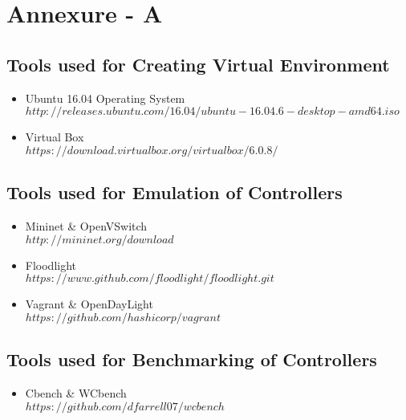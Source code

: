 \chapter*{Annexure - A}

\section*{Tools used for Creating Virtual Environment}

\begin{itemize}

    \item Ubuntu 16.04 Operating System \\
    $http://releases.ubuntu.com/16.04/ubuntu-16.04.6-desktop-amd64.iso$
    
    \item Virtual Box \\
    $https://download.virtualbox.org/virtualbox/6.0.8/$
    
\end{itemize}

\section*{Tools used for Emulation of Controllers}

\begin{itemize}

    \item Mininet \& OpenVSwitch \\
    $http://mininet.org/download$
    \item Floodlight \\
    $https://www.github.com/floodlight/floodlight.git$
    \item Vagrant \& OpenDayLight \\
    $https://github.com/hashicorp/vagrant$
    
\end{itemize}

\section*{Tools used for Benchmarking of Controllers}

\begin{itemize}
    
    \item Cbench \& WCbench \\ 
    $https://github.com/dfarrell07/wcbench$
        
\end{itemize}